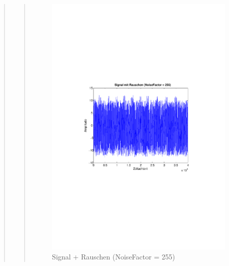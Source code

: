 \begin{quote}
\begin{quote}
        
         \begin{figure}[H]
        \centering
            \includegraphics[scale=0.65, trim = 1.5cm 9cm 1.5cm 9cm,
            clip]{./Bilder/aufgabe1/nf255}
                \caption{Signal + Rauschen (NoiseFactor = 255)}
        \end{figure}
        

\end{quote}
\end{quote}
